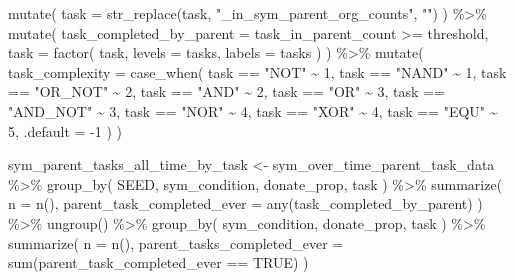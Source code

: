 \documentclass[
]{book}
\newenvironment{Shaded}{\begin{snugshade}}{\end{snugshade}}
\newcommand{\AttributeTok}[1]{\textcolor[rgb]{0.77,0.63,0.00}{#1}}
\newcommand{\ConstantTok}[1]{\textcolor[rgb]{0.00,0.00,0.00}{#1}}
\newcommand{\DecValTok}[1]{\textcolor[rgb]{0.00,0.00,0.81}{#1}}
\newcommand{\FunctionTok}[1]{\textcolor[rgb]{0.00,0.00,0.00}{#1}}
\newcommand{\NormalTok}[1]{#1}
\newcommand{\OtherTok}[1]{\textcolor[rgb]{0.56,0.35,0.01}{#1}}
\newcommand{\SpecialCharTok}[1]{\textcolor[rgb]{0.00,0.00,0.00}{#1}}
\newcommand{\StringTok}[1]{\textcolor[rgb]{0.31,0.60,0.02}{#1}}
\begin{document}
\begin{Shaded}
\begin{Highlighting}[]
  \FunctionTok{mutate}\NormalTok{(}
    \AttributeTok{task =} \FunctionTok{str\_replace}\NormalTok{(task, }\StringTok{"\_in\_sym\_parent\_org\_counts"}\NormalTok{, }\StringTok{""}\NormalTok{)}
\NormalTok{  ) }\SpecialCharTok{\%\textgreater{}\%}
  \FunctionTok{mutate}\NormalTok{(}
    \AttributeTok{task\_completed\_by\_parent =}\NormalTok{ task\_in\_parent\_count }\SpecialCharTok{\textgreater{}=}\NormalTok{ threshold,}
    \AttributeTok{task =} \FunctionTok{factor}\NormalTok{(}
\NormalTok{      task,}
      \AttributeTok{levels =}\NormalTok{ tasks,}
      \AttributeTok{labels =}\NormalTok{ tasks}
\NormalTok{    )}
\NormalTok{  ) }\SpecialCharTok{\%\textgreater{}\%}
  \FunctionTok{mutate}\NormalTok{(}
    \AttributeTok{task\_complexity =} \FunctionTok{case\_when}\NormalTok{(}
\NormalTok{      task }\SpecialCharTok{==} \StringTok{"NOT"} \SpecialCharTok{\textasciitilde{}} \DecValTok{1}\NormalTok{,}
\NormalTok{      task }\SpecialCharTok{==} \StringTok{"NAND"} \SpecialCharTok{\textasciitilde{}} \DecValTok{1}\NormalTok{,}
\NormalTok{      task }\SpecialCharTok{==} \StringTok{"OR\_NOT"} \SpecialCharTok{\textasciitilde{}} \DecValTok{2}\NormalTok{,}
\NormalTok{      task }\SpecialCharTok{==} \StringTok{"AND"} \SpecialCharTok{\textasciitilde{}} \DecValTok{2}\NormalTok{,}
\NormalTok{      task }\SpecialCharTok{==} \StringTok{"OR"} \SpecialCharTok{\textasciitilde{}} \DecValTok{3}\NormalTok{,}
\NormalTok{      task }\SpecialCharTok{==} \StringTok{"AND\_NOT"} \SpecialCharTok{\textasciitilde{}} \DecValTok{3}\NormalTok{,}
\NormalTok{      task }\SpecialCharTok{==} \StringTok{"NOR"} \SpecialCharTok{\textasciitilde{}} \DecValTok{4}\NormalTok{,}
\NormalTok{      task }\SpecialCharTok{==} \StringTok{"XOR"} \SpecialCharTok{\textasciitilde{}} \DecValTok{4}\NormalTok{,}
\NormalTok{      task }\SpecialCharTok{==} \StringTok{"EQU"} \SpecialCharTok{\textasciitilde{}} \DecValTok{5}\NormalTok{,}
      \AttributeTok{.default =} \SpecialCharTok{{-}}\DecValTok{1}
\NormalTok{    )}
\NormalTok{  )}

\NormalTok{sym\_parent\_tasks\_all\_time\_by\_task }\OtherTok{\textless{}{-}}\NormalTok{ sym\_over\_time\_parent\_task\_data }\SpecialCharTok{\%\textgreater{}\%}
  \FunctionTok{group\_by}\NormalTok{(}
\NormalTok{    SEED,}
\NormalTok{    sym\_condition,}
\NormalTok{    donate\_prop,}
\NormalTok{    task}
\NormalTok{  ) }\SpecialCharTok{\%\textgreater{}\%}
  \FunctionTok{summarize}\NormalTok{(}
    \AttributeTok{n =} \FunctionTok{n}\NormalTok{(),}
    \AttributeTok{parent\_task\_completed\_ever =} \FunctionTok{any}\NormalTok{(task\_completed\_by\_parent)}
\NormalTok{  ) }\SpecialCharTok{\%\textgreater{}\%}
  \FunctionTok{ungroup}\NormalTok{() }\SpecialCharTok{\%\textgreater{}\%}
  \FunctionTok{group\_by}\NormalTok{(}
\NormalTok{    sym\_condition,}
\NormalTok{    donate\_prop,}
\NormalTok{    task}
\NormalTok{  ) }\SpecialCharTok{\%\textgreater{}\%}
  \FunctionTok{summarize}\NormalTok{(}
    \AttributeTok{n =} \FunctionTok{n}\NormalTok{(),}
    \AttributeTok{parent\_tasks\_completed\_ever =} \FunctionTok{sum}\NormalTok{(parent\_task\_completed\_ever }\SpecialCharTok{==} \ConstantTok{TRUE}\NormalTok{)}
\NormalTok{  )}
\end{Highlighting}
\end{Shaded}
\end{document}
